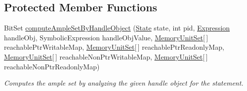 \subsection*{Protected Member Functions}
\begin{DoxyCompactItemize}
\item 
Bit\+Set \hyperlink{classedu_1_1udel_1_1cis_1_1vsl_1_1civl_1_1library_1_1common_1_1BaseLibraryEnabler_a9bf39d8795542f848f6fc359702b9ca6}{compute\+Ample\+Set\+By\+Handle\+Object} (\hyperlink{interfaceedu_1_1udel_1_1cis_1_1vsl_1_1civl_1_1state_1_1IF_1_1State}{State} state, int pid, \hyperlink{interfaceedu_1_1udel_1_1cis_1_1vsl_1_1civl_1_1model_1_1IF_1_1expression_1_1Expression}{Expression} handle\+Obj, Symbolic\+Expression handle\+Obj\+Value, \hyperlink{interfaceedu_1_1udel_1_1cis_1_1vsl_1_1civl_1_1state_1_1IF_1_1MemoryUnitSet}{Memory\+Unit\+Set}\mbox{[}$\,$\mbox{]} reachable\+Ptr\+Writable\+Map, \hyperlink{interfaceedu_1_1udel_1_1cis_1_1vsl_1_1civl_1_1state_1_1IF_1_1MemoryUnitSet}{Memory\+Unit\+Set}\mbox{[}$\,$\mbox{]} reachable\+Ptr\+Readonly\+Map, \hyperlink{interfaceedu_1_1udel_1_1cis_1_1vsl_1_1civl_1_1state_1_1IF_1_1MemoryUnitSet}{Memory\+Unit\+Set}\mbox{[}$\,$\mbox{]} reachable\+Non\+Ptr\+Writable\+Map, \hyperlink{interfaceedu_1_1udel_1_1cis_1_1vsl_1_1civl_1_1state_1_1IF_1_1MemoryUnitSet}{Memory\+Unit\+Set}\mbox{[}$\,$\mbox{]} reachable\+Non\+Ptr\+Readonly\+Map)
\begin{DoxyCompactList}\small\item\em Computes the ample set by analyzing the given handle object for the statement. \end{DoxyCompactList}\end{DoxyCompactItemize}
